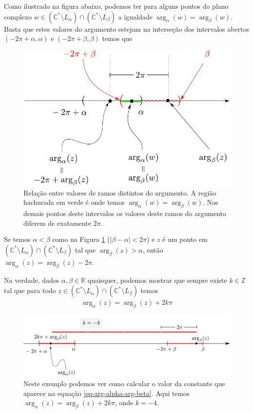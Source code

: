 Como ilustrado na figura abaixo, podemos ter para alguns pontos do plano complexo
$w\in (\mathbb{C}^{*}\setminus L_{\alpha})\cap(\mathbb{C}^{*}\setminus L_{\beta})$
a igualdade $\arg_{\alpha}(w) = \arg_{\beta}(w)$.
Basta que estes valores do argumento estejam na interseção dos intervalos abertos 
$(-2\pi+\alpha,\alpha)$ e $(-2\pi+\beta,\beta)$ temos que 
\begin{figure}[H]
\centering
\includegraphics[width=0.60\linewidth]{"Figuras/ramos-argumento1"}
\caption{Relação entre valores de ramos distintos do argumento. A região hachurada em
verde é onde temos $\arg_{\alpha}(w)=\arg_{\beta}(w)$. Nos demais pontos deste intervalos
os valores deste ramos do argumento diferem de exatamente $2\pi$.}
\label{fig:ramos-argumento1}
\end{figure}

Se temos $\alpha<\beta$ como na Figura \ref{fig:ramos-argumento1} 
($|\beta-\alpha|<2\pi$) e $z$ é um ponto em 
$(\mathbb{C}^{*}\setminus L_{\alpha})\cap(\mathbb{C}^{*}\setminus L_{\beta})$ 
tal que $\arg_{\beta}(z)>\alpha$, então $\arg_{\alpha}(z)=\arg_{\beta}(z)-2\pi$.


Na verdade, dados $\alpha,\beta\in\mathbb{R}$ quaisquer, podemos mostrar que sempre existe $k\in\mathbb{Z}$ tal que para todo 
$z\in (\mathbb{C}^{*}\setminus L_{\alpha})\cap(\mathbb{C}^{*}\setminus L_{\beta})$  
temos 
\begin{align}\label{eq-arg-alpha-arg-beta}
\arg_{\alpha}(z)=\arg_{\beta}(z)+2k\pi
\end{align}

\begin{figure}[H]
\centering
\includegraphics[width=1\linewidth]{"Figuras/ramos-argumento2"}
\caption{Neste exemplo podemos ver como calcular o valor da constante que aparece na equação 
\ref{eq-arg-alpha-arg-beta}. Aqui temos $\arg_{\alpha}(z)=\arg_{\beta}(z)+2k\pi$, onde $k=-4$.}
\label{fig:ramos-argumento2}
\end{figure}


